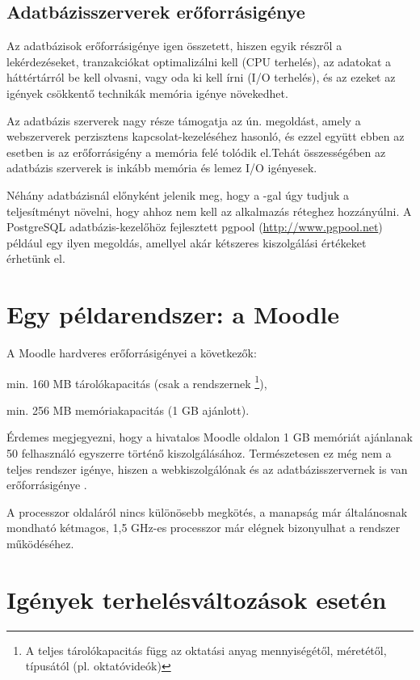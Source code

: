 \subsection{Adatbázisszerverek erőforrásigénye}

Az adatbázisok erőforrásigénye igen összetett, hiszen egyik részről a lekérdezéseket, tranzakciókat optimalizálni kell (CPU terhelés), az adatokat a háttértárról be kell olvasni, vagy oda ki kell írni (I/O terhelés), és az ezeket az igények csökkentő technikák memória igénye növekedhet.

Az adatbázis szerverek nagy része támogatja az ún.  megoldást, amely a webszerverek perzisztens kapcsolat-kezeléséhez hasonló, és ezzel együtt ebben az esetben is az erőforrásigény a memória felé tolódik el.Tehát összességében az adatbázis szerverek is inkább memória és lemez I/O igényesek.

Néhány adatbázisnál előnyként jelenik meg, hogy a -gal úgy tudjuk a teljesítményt növelni, hogy ahhoz nem kell az alkalmazás réteghez hozzányúlni. A PostgreSQL adatbázis-kezelőhöz fejlesztett pgpool (\href{http://www.pgpool.net}{http://www.pgpool.net}) például egy ilyen megoldás, amellyel akár kétszeres kiszolgálási értékeket érhetünk el.

\section{Egy példarendszer: a Moodle}
A Moodle hardveres erőforrásigényei a következők:
\begin{sajat_itemize}
\item min. 160 MB tárolókapacitás (csak a rendszernek \footnote{A teljes tárolókapacitás függ az oktatási anyag mennyiségétől, méretétől, típusától (pl. oktatóvideók)}),
\item min. 256 MB memóriakapacitás (1 GB ajánlott).
\end{sajat_itemize}
Érdemes megjegyezni, hogy a hivatalos Moodle oldalon 1 GB memóriát ajánlanak 50 felhasználó egyszerre történő kiszolgálásához.
Természetesen ez még nem a teljes rendszer igénye, hiszen a webkiszolgálónak és az adatbázisszervernek is van erőforrásigénye \cite{moodleinst}.

A processzor oldaláról nincs különösebb megkötés, a manapság már általánosnak mondható kétmagos, 1,5 GHz-es processzor már elégnek bizonyulhat a rendszer működéséhez.

\section{Igények terhelésváltozások esetén}


